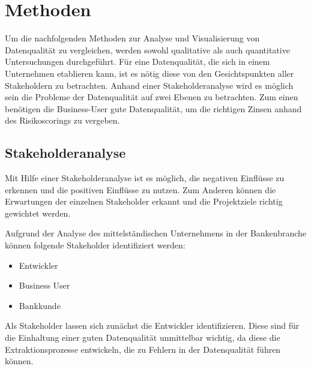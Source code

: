 \chapter{Methoden}\label{ch:method}
Um die nachfolgenden Methoden zur Analyse und Visualisierung von Datenqualität zu vergleichen, werden sowohl qualitative als auch quantitative Untersuchungen durchgeführt.
Für eine Datenqualität, die sich in einem Unternehmen etablieren kann, ist es nötig diese von den Gesichtspunkten aller Stakeholdern zu betrachten.
Anhand einer Stakeholderanalyse wird es möglich sein die Probleme der Datenqualität auf zwei Ebenen zu betrachten. 
Zum einen benötigen die Business-User gute Datenqualität, um die richtigen Zinsen anhand des Risikoscorings zu vergeben.




\section{Stakeholderanalyse}
Mit Hilfe einer Stakeholderanalyse ist es möglich, die negativen Einflüsse zu erkennen und die positiven Einflüsse zu nutzen.
Zum Anderen können die Erwartungen der einzelnen Stakeholder erkannt und die Projektziele richtig gewichtet werden. 







Aufgrund der Analyse des mittelständischen Unternehmens in der Bankenbranche können folgende Stakeholder identifiziert werden:
\begin{itemize}
\item Entwickler
\item Business User
\item Bankkunde
\end{itemize}

Als Stakeholder lassen sich zunächst die Entwickler identifizieren.
Diese sind für die Einhaltung einer guten Datenqualität unmittelbar wichtig, da diese die Extraktionsprozesse entwickeln, die zu Fehlern in der Datenqualität führen können.

